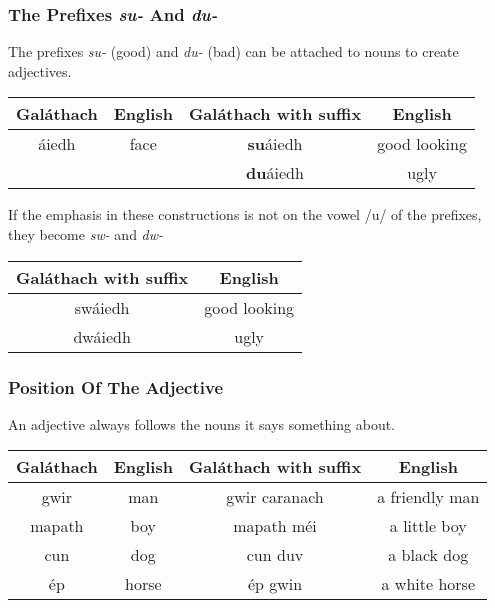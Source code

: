 \subsubsection{The Prefixes \textit{su-} And \textit{du-}}

The prefixes \textit{su-} (good) and \textit{du-} (bad) can be attached to nouns to create adjectives.
\begin{table}[H]
\centering
\begin{tabu}{c|c|c|c}
  \textbf{Gal\'{a}thach} & \textbf{English} & \textbf{Gal\'{a}thach with suffix} & \textbf{English}\\
  \toprule
  \'{a}iedh & face & \textbf{su}\'{a}iedh & good looking\\
  & & \textbf{du}\'{a}iedh & ugly
\end{tabu}
\label{examples_suffix_su_du}
\end{table}

If the emphasis in these constructions is not on the vowel /u/ of the prefixes, they become \textit{sw-} and \textit{dw-}
\begin{table}[H]
\centering
\begin{tabu}{c|c}
  \textbf{Gal\'{a}thach with suffix} & \textbf{English}\\
  \toprule
  sw\'{a}iedh & good looking\\
  dw\'{a}iedh & ugly
\end{tabu}
\label{examples_suffix_sw_dw}
\end{table}

\subsubsection{Position Of The Adjective}

An adjective always follows the nouns it says something about.
\begin{table}[H]
\centering
\begin{tabu}{c|c|c|c}
  \textbf{Gal\'{a}thach} & \textbf{English} & \textbf{Gal\'{a}thach with suffix} & \textbf{English}\\
  \toprule
  gwir & man & gwir caranach & a friendly man\\
  mapath & boy & mapath m\'{e}i & a little boy\\
  cun & dog & cun duv & a black dog\\
  \'{e}p & horse & \'{e}p gwin & a white horse
\end{tabu}
\label{examples_adjective_order}
\end{table}

